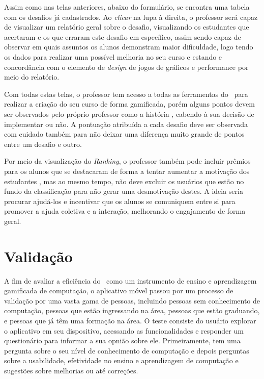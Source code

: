 
Assim como nas telas anteriores, abaixo do formulário, se encontra uma tabela com os desafios já cadastrados. Ao \textit{clicar} na lupa à direita, o professor será capaz de visualizar um relatório geral sobre o desafio, visualizando os estudantes que acertaram e os que erraram este desafio em específico, assim sendo capaz de observar em quais assuntos os alunos demonstram maior dificuldade, logo tendo os dados para realizar uma possível melhoria no seu curso e estando e concordância com o elemento de \textit{design} de jogos de gráficos e performance por meio do relatório.


Com todas estas telas, o professor tem acesso a todas as ferramentas do \appName\ para realizar a criação do seu curso de forma gamificada, porém alguns pontos devem ser observados pelo próprio professor como a história \cite{gamification_motivates}, cabendo à sua decisão de implementar ou não. A pontuação atribuída a cada desafio deve ser observada com cuidado também para não deixar uma diferença muito grande de pontos entre um desafio e outro. 

Por meio da visualização do \textit{Ranking}, o professor também pode incluir prêmios para os alunos que se destacaram de forma a tentar aumentar a motivação dos estudantes \cite{ranking_motivation}, mas ao mesmo tempo, não deve excluir os usuários que estão no fundo da classificação para não gerar uma desmotivação destes. A ideia seria procurar ajudá-los e incentivar que os alunos se comuniquem entre si para promover a ajuda coletiva e a interação, melhorando o engajamento de forma geral.

\section{Validação}

A fim de avaliar a eficiência do \appName\ como um instrumento de ensino e aprendizagem gamificada de computação, o aplicativo móvel passou por um processo de validação por uma vasta gama de pessoas, incluindo pessoas sem conhecimento de computação, pessoas que estão ingressando na área, pessoas que estão graduando, e pessoas que já têm uma formação na área. O teste consiste do usuário explorar o aplicativo em seu dispositivo, acessando as funcionalidades e responder um questionário para informar a sua opnião sobre ele. Primeiramente, tem uma pergunta sobre o seu nível de conhecimento de computação e depois perguntas sobre a usabilidade, efetividade no ensino e aprendizagem de computação e sugestões sobre melhorias ou até correções.

